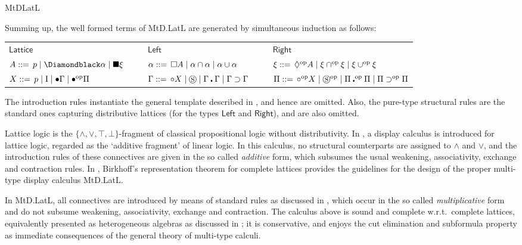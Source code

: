 \begin{entry}{MtDLatL}
\begin{clarifications}
Summing up, the well formed terms of MtD.LatL are generated by simultaneous induction as follows:
\begin{center}
\begin{tabular}{lll}
$\mathsf{Lattice}$ \ \ \ &
$\mathsf{Left}$ \ \ \ &
$\mathsf{Right}$ \\

$A ::= \,p \mid \pbdiabp \alpha \mid \bboxb \xi$ \ \ \ &
$\alpha     ::= \, \Box A \mid \alpha \cap \alpha \mid \alpha \cup \alpha$ \ \ \ &
$\xi     ::= \, \Diamond^\mathrm{op} A \mid \xi \cap^\mathrm{op} \xi \mid \xi \cup^\mathrm{op} \xi$ \\

$X ::= \, p \mid \textrm{I} \mid \bullet \Gamma \mid \bullet^{\mathrm{op}} \Pi$ \ \ \ &
$\Gamma ::= \, \circ X \mid \circledS \mid \Gamma \centerdot \Gamma \mid \Gamma\supset \Gamma$ \ \ \ &
$\Pi ::= \, \circ^\mathrm{op} X \mid \circledS^\mathrm{op} \mid \Pi \centerdot^\mathrm{op} \Pi \mid \Pi \supset^\mathrm{op} \Pi$ \\
\end{tabular}
\end{center}

The introduction rules instantiate the general template described in , and hence are omitted. Also, the pure-type structural rules are the standard ones capturing distributive lattices (for the types $\mathsf{Left}$ and $\mathsf{Right}$), and are also omitted.
\end{clarifications}

\begin{history} Lattice logic is the $\{\wedge, \vee, \top, \bot\}$-fragment of classical propositional logic without distributivity. In \cite{Belnap1990}, a display calculus is introduced for lattice logic, regarded as the `additive fragment' of  linear logic. In this calculus, no  structural counterparts are assigned  to $\wedge$ and $\vee$, and the introduction rules of these connectives are given in the so called {\em additive} form, which subsumes the usual weakening, associativity, exchange and contraction rules. In \cite{GrecoPalmigiano2017}, Birkhoff's representation theorem for complete lattices provides the guidelines for the design of the proper multi-type display calculus MtD.LatL.
\end{history}

\begin{technicalities}
 In MtD.LatL, all connectives are introduced by means of standard rules as discussed in , which occur in the so called {\em multiplicative} form and do not subsume weakening, associativity, exchange and contraction. The calculus above is sound and complete w.r.t.~complete lattices, equivalently presented as heterogeneous algebras as discussed  in \cite{GrecoPalmigiano2017}; it is conservative, and enjoys the cut elimination and subformula property as immediate consequences of the general theory of multi-type calculi.
\end{technicalities}

\end{entry}
